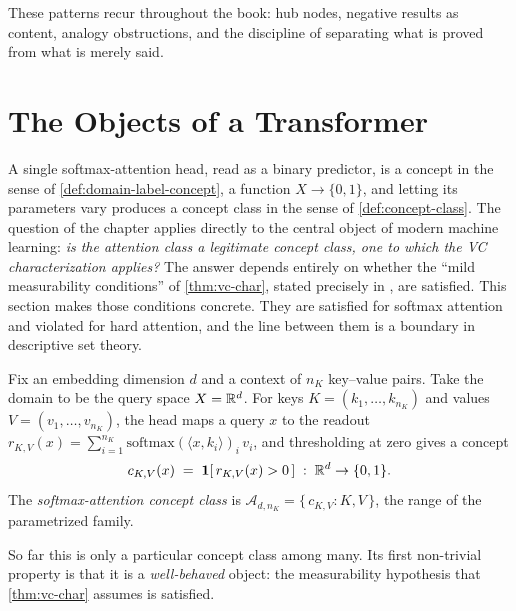These patterns recur throughout the book: hub nodes, negative results as content, analogy obstructions, and the discipline of separating what is proved from what is merely said.


\section{The Objects of a Transformer}
\label{sec:ch1-transformer}

A single softmax-attention head, read as a binary predictor, is a concept in the sense of \cref{def:domain-label-concept}, a function $X \to \{0,1\}$, and letting its parameters vary produces a concept class in the sense of \cref{def:concept-class}. The question of the chapter applies directly to the central object of modern machine learning: \emph{is the attention class a legitimate concept class, one to which the VC characterization applies?} The answer depends entirely on whether the ``mild measurability conditions'' of \cref{thm:vc-char}, stated precisely in , are satisfied. This section makes those conditions concrete. They are satisfied for softmax attention and violated for hard attention, and the line between them is a boundary in descriptive set theory.

\begin{defn}
\label{def:attention-concept-class}
Fix an embedding dimension $d$ and a context of $n_K$ key--value pairs.  Take the domain to be the query space $X = \mathbb{R}^d$.  For keys $K = (k_1,\dots,k_{n_K})$ and values $V = (v_1,\dots,v_{n_K})$, the head maps a query $x$ to the readout $r_{K,V}(x) = \sum_{i=1}^{n_K} \mathrm{softmax}(\langle x, k_i\rangle)_i\, v_i$, and thresholding at zero gives a concept
\[
  c_{K,V}(x) \;=\; \mathbf{1}[\,r_{K,V}(x) > 0\,] \;:\; \mathbb{R}^d \to \{0,1\}.
\]
The \emph{softmax-attention concept class} is $\mathcal{A}_{d,n_K} = \{\, c_{K,V} : K, V \,\}$, the range of the parametrized family.
\end{defn}

So far this is only a particular concept class among many. Its first non-trivial property is that it is a \emph{well-behaved} object: the measurability hypothesis that \cref{thm:vc-char} assumes is satisfied.

